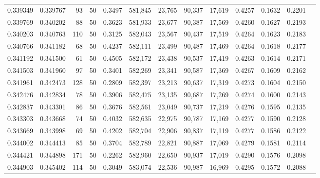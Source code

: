 \begin{tabular}{rrrrrrrrrrrrr}
0.339349 & 0.339767 &    93 &  50 &                                     0.3497 & 581,845 &  23,765 &  90,337 &  17,619 & 0.4257 & 0.1632 & 0.2201 \\
0.339769 & 0.340202 &    88 &  50 &                                     0.3623 & 581,933 &  23,677 &  90,387 &  17,569 & 0.4260 & 0.1627 & 0.2193 \\
0.340203 & 0.340763 &   110 &  50 &                                     0.3125 & 582,043 &  23,567 &  90,437 &  17,519 & 0.4264 & 0.1623 & 0.2183 \\
0.340766 & 0.341182 &    68 &  50 &                                     0.4237 & 582,111 &  23,499 &  90,487 &  17,469 & 0.4264 & 0.1618 & 0.2177 \\
0.341192 & 0.341500 &    61 &  50 &                                     0.4505 & 582,172 &  23,438 &  90,537 &  17,419 & 0.4263 & 0.1614 & 0.2171 \\
0.341503 & 0.341960 &    97 &  50 &                                     0.3401 & 582,269 &  23,341 &  90,587 &  17,369 & 0.4267 & 0.1609 & 0.2162 \\
0.341961 & 0.342473 &   128 &  50 &                                     0.2809 & 582,397 &  23,213 &  90,637 &  17,319 & 0.4273 & 0.1604 & 0.2150 \\
0.342476 & 0.342834 &    78 &  50 &                                     0.3906 & 582,475 &  23,135 &  90,687 &  17,269 & 0.4274 & 0.1600 & 0.2143 \\
0.342837 & 0.343301 &    86 &  50 &                                     0.3676 & 582,561 &  23,049 &  90,737 &  17,219 & 0.4276 & 0.1595 & 0.2135 \\
0.343303 & 0.343668 &    74 &  50 &                                     0.4032 & 582,635 &  22,975 &  90,787 &  17,169 & 0.4277 & 0.1590 & 0.2128 \\
0.343669 & 0.343998 &    69 &  50 &                                     0.4202 & 582,704 &  22,906 &  90,837 &  17,119 & 0.4277 & 0.1586 & 0.2122 \\
0.344002 & 0.344413 &    85 &  50 &                                     0.3704 & 582,789 &  22,821 &  90,887 &  17,069 & 0.4279 & 0.1581 & 0.2114 \\
0.344421 & 0.344898 &   171 &  50 &                                     0.2262 & 582,960 &  22,650 &  90,937 &  17,019 & 0.4290 & 0.1576 & 0.2098 \\
0.344903 & 0.345402 &   114 &  50 &                                     0.3049 & 583,074 &  22,536 &  90,987 &  16,969 & 0.4295 & 0.1572 & 0.2088 \\

\end{tabular}
